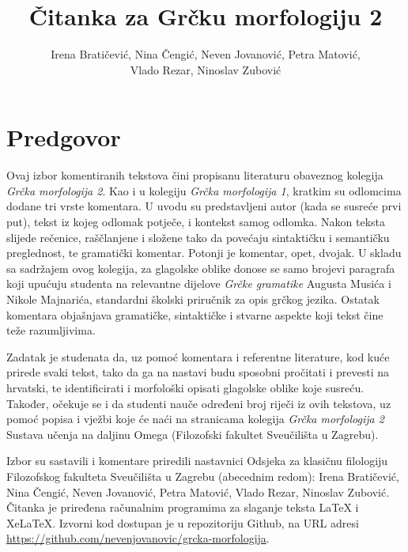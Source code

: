 \documentclass[a4paper,12pt,twoside]{report}
\newcommand{\subtitle}[1]{%
  \posttitle{%
    \par\end{center}
    \begin{center}\large#1\end{center}
    \vskip0.5em}%
}
\begin{document}
\title{Čitanka za Grčku morfologiju 2}
\author{Irena Bratičević, Nina Čengić, Neven Jovanović, Petra Matović,\\Vlado Rezar, Ninoslav Zubović}
\date{}
\maketitle

\clearpage

\tableofcontents

\thispagestyle{empty}




\chapter*{Predgovor}
\label{chap:predgovor}

Ovaj izbor komentiranih tekstova čini propisanu literaturu obaveznog kolegija \textit{Grčka morfologija 2}. Kao i u kolegiju \textit{Grčka morfologija 1}, kratkim su odlomcima dodane tri vrste komentara. U uvodu su predstavljeni autor (kada se susreće prvi put), tekst iz kojeg odlomak potječe, i kontekst samog odlomka. Nakon teksta slijede rečenice, raščlanjene i složene tako da povećaju sintaktičku i semantičku preglednost, te gramatički komentar. Potonji je komentar, opet, dvojak. U skladu sa sadržajem ovog kolegija, za glagolske oblike donose se samo brojevi paragrafa koji upućuju studenta na relevantne dijelove \textit{Grčke gramatike} Augusta Musića i Nikole Majnarića, standardni školski priručnik za opis grčkog jezika. Ostatak komentara objašnjava gramatičke, sintaktičke i stvarne aspekte koji tekst čine teže razumljivima.

Zadatak je studenata da, uz pomoć komentara i referentne literature, kod kuće prirede svaki tekst, tako da ga na nastavi budu sposobni pročitati i prevesti na hrvatski, te identificirati i morfološki opisati glagolske oblike koje susreću. Također, očekuje se i da studenti nauče određeni broj riječi iz ovih tekstova, uz pomoć popisa i vježbi koje će naći na stranicama kolegija \textit{Grčka morfologija 2} Sustava učenja na daljinu Omega (Filozofski fakultet Sveučilišta u Zagrebu).


Izbor su sastavili i komentare priredili nastavnici Odsjeka za klasičnu filologiju Filozofskog fakulteta Sveučilišta u Zagrebu (abecednim redom): Irena Bratičević, Nina Čengić, Neven Jovanović, Petra Matović, Vlado Rezar, Ninoslav Zubović. Čitanka je priređena računalnim programima za slaganje teksta LaTeX i XeLaTeX. Izvorni kod dostupan je u repozitoriju Github, na URL adresi \url{https://github.com/nevenjovanovic/grcka-morfologija}.
\end{document}
